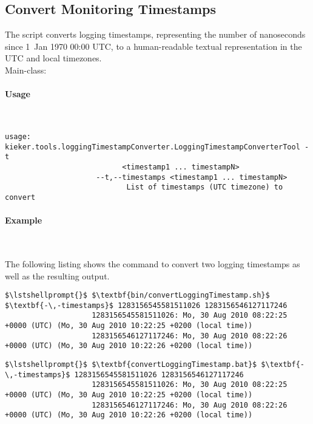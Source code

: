 		\subsection{Convert Monitoring Timestamps}
		
			The script converts \KiekerMonitoringPart{} logging timestamps, representing the number of nanoseconds since 1~Jan 1970 00:00 UTC, to a human-readable textual representation in the UTC and local timezones.\\
			
			\noindent Main-class: {\small {}}

			\paragraph*{Usage}\

				\setTextListing
				\begin{lstlisting}[gobble = 10]
					usage: kieker.tools.loggingTimestampConverter.LoggingTimestampConverterTool -t
						   <timestamp1 ... timestampN>
					 --t,--timestamps <timestamp1 ... timestampN>
							List of timestamps (UTC timezone) to convert
				\end{lstlisting}

			\paragraph*{Example}\

				\noindent
				The following listing shows the command to convert two logging timestamps as well as the resulting output.

				\setTextListing
				\begin{lstlisting}[gobble = 10, caption=Execution under UNIX-like systems]
					$\lstshellprompt{}$ $\textbf{bin/convertLoggingTimestamp.sh}$ $\textbf{-\,-timestamps}$ 1283156545581511026 1283156546127117246 
					1283156545581511026: Mo, 30 Aug 2010 08:22:25 +0000 (UTC) (Mo, 30 Aug 2010 10:22:25 +0200 (local time))
					1283156546127117246: Mo, 30 Aug 2010 08:22:26 +0000 (UTC) (Mo, 30 Aug 2010 10:22:26 +0200 (local time))
				\end{lstlisting}

				\begin{lstlisting}[gobble = 10, caption=Execution under Windows]
					$\lstshellprompt{}$ $\textbf{convertLoggingTimestamp.bat}$ $\textbf{-\,-timestamps}$ 1283156545581511026 1283156546127117246 
					1283156545581511026: Mo, 30 Aug 2010 08:22:25 +0000 (UTC) (Mo, 30 Aug 2010 10:22:25 +0200 (local time))
					1283156546127117246: Mo, 30 Aug 2010 08:22:26 +0000 (UTC) (Mo, 30 Aug 2010 10:22:26 +0200 (local time))
				\end{lstlisting}
		
